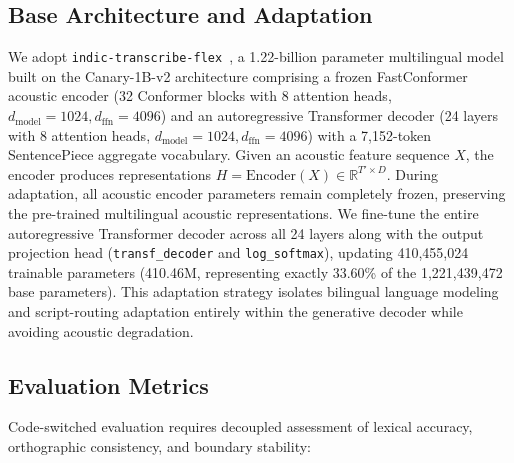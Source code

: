 \documentclass[10pt,twocolumn,a4paper]{article}
\begin{document}
\subsection{Base Architecture and Adaptation}
We adopt \texttt{indic-transcribe-flex}~\cite{indic_transcribe_flex}, a 1.22-billion parameter multilingual model built on the Canary-1B-v2 architecture comprising a frozen FastConformer acoustic encoder (32 Conformer blocks with 8 attention heads, $d_{\text{model}}=1024, d_{\text{ffn}}=4096$) and an autoregressive Transformer decoder (24 layers with 8 attention heads, $d_{\text{model}}=1024, d_{\text{ffn}}=4096$) with a 7,152-token SentencePiece aggregate vocabulary. Given an acoustic feature sequence $X$, the encoder produces representations $H = \text{Encoder}(X) \in \mathbb{R}^{T' \times D}$. During adaptation, all acoustic encoder parameters remain completely frozen, preserving the pre-trained multilingual acoustic representations. We fine-tune the entire autoregressive Transformer decoder across all 24 layers along with the output projection head (\texttt{transf\_decoder} and \texttt{log\_softmax}), updating 410,455,024 trainable parameters (410.46M, representing exactly 33.60\% of the 1,221,439,472 base parameters). This adaptation strategy isolates bilingual language modeling and script-routing adaptation entirely within the generative decoder while avoiding acoustic degradation.

\subsection{Evaluation Metrics}
Code-switched evaluation requires decoupled assessment of lexical accuracy, orthographic consistency, and boundary stability:
\end{document}
